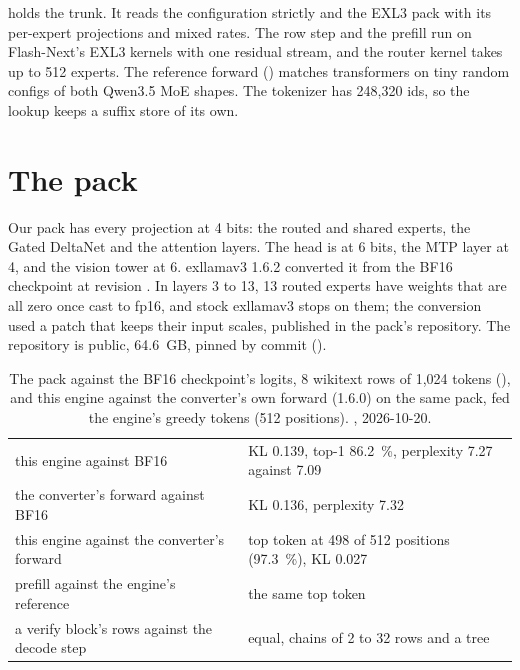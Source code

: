  holds the trunk. It reads the configuration strictly and the EXL3 pack with its per-expert projections and mixed rates. The row step and the prefill run on Flash-Next's EXL3 kernels with one residual stream, and the router kernel takes up to 512 experts. The reference forward () matches transformers on tiny random configs of both Qwen3.5 MoE shapes. The tokenizer has 248,320 ids, so the lookup keeps a suffix store of its own.

\section{The pack}

Our pack has every projection at 4 bits: the routed and shared experts, the Gated DeltaNet and the attention layers. The head is at 6 bits, the MTP layer at 4, and the vision tower at 6. exllamav3 1.6.2 converted it from the BF16 checkpoint at revision . In layers 3 to 13, 13 routed experts have weights that are all zero once cast to fp16, and stock exllamav3 stops on them; the conversion used a patch that keeps their input scales, published in the pack's repository. The repository  is public, 64.6~GB, pinned by commit ().

\begin{table}[htbp]
\centering\small
\caption[Ornith's quality]{The pack against the BF16 checkpoint's logits, 8 wikitext rows of 1,024 tokens (), and this engine against the converter's own forward (1.6.0) on the same pack, fed the engine's greedy tokens (512 positions). \measured, 2026-10-20.}\label{tab:orn-quality}
\begin{tabularx}{\linewidth}{@{}L{.4\linewidth}Y@{}}
\toprule
{} &  \\
\midrule
this engine against BF16 & KL 0.139, top-1 86.2~\%, perplexity 7.27 against 7.09 \\
the converter's forward against BF16 & KL 0.136, perplexity 7.32 \\
this engine against the converter's forward & top token at 498 of 512 positions (97.3~\%), KL 0.027 \\
prefill against the engine's reference & the same top token \\
a verify block's rows against the decode step & equal, chains of 2 to 32 rows and a tree \\
\bottomrule
\end{tabularx}
\end{table}

